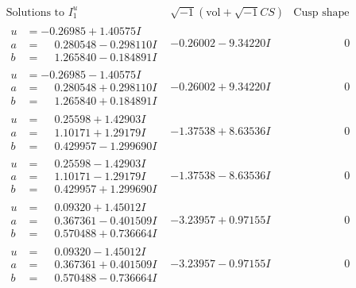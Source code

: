 \documentclass[1p]{elsarticle_modified}
\theoremstyle{definition}
\newcommand{\I}{\sqrt{-1}}
\begin{document}
$$\begin{array}{c|c|c}
 \end{array}$$\newpage$$\begin{array}{c|c|c}  
\text{Solutions to }I^u_{1}& \I (\text{vol} + \sqrt{-1}CS) & \text{Cusp shape}\\
 \hline 
\begin{aligned}
u &= -0.26985 + 1.40575 I \\
a &= \phantom{-}0.280548 - 0.298110 I \\
b &= \phantom{-}1.265840 - 0.184891 I\end{aligned}
 & -0.26002 - 9.34220 I & \phantom{-0.000000 } 0 \\ \hline\begin{aligned}
u &= -0.26985 - 1.40575 I \\
a &= \phantom{-}0.280548 + 0.298110 I \\
b &= \phantom{-}1.265840 + 0.184891 I\end{aligned}
 & -0.26002 + 9.34220 I & \phantom{-0.000000 } 0 \\ \hline\begin{aligned}
u &= \phantom{-}0.25598 + 1.42903 I \\
a &= \phantom{-}1.10171 + 1.29179 I \\
b &= \phantom{-}0.429957 - 1.299690 I\end{aligned}
 & -1.37538 + 8.63536 I & \phantom{-0.000000 } 0 \\ \hline\begin{aligned}
u &= \phantom{-}0.25598 - 1.42903 I \\
a &= \phantom{-}1.10171 - 1.29179 I \\
b &= \phantom{-}0.429957 + 1.299690 I\end{aligned}
 & -1.37538 - 8.63536 I & \phantom{-0.000000 } 0 \\ \hline\begin{aligned}
u &= \phantom{-}0.09320 + 1.45012 I \\
a &= \phantom{-}0.367361 - 0.401509 I \\
b &= \phantom{-}0.570488 + 0.736664 I\end{aligned}
 & -3.23957 + 0.97155 I & \phantom{-0.000000 } 0 \\ \hline\begin{aligned}
u &= \phantom{-}0.09320 - 1.45012 I \\
a &= \phantom{-}0.367361 + 0.401509 I \\
b &= \phantom{-}0.570488 - 0.736664 I\end{aligned}
 & -3.23957 - 0.97155 I & \phantom{-0.000000 } 0 \\ \hline\begin{aligned}

\end{aligned}
\end{array}$$
\end{document}
